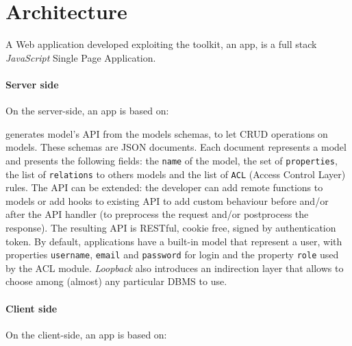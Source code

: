 \section{Architecture}\label{sec:architecture}

A Web application developed exploiting the  toolkit, an  app, is a full stack {\em JavaScript} Single Page Application.

\paragraph{Server side}

On the server-side, an  app is based on:

\begin{description}
\itemsep1pt\parskip0pt
\item[StrongLoop LoopBack] generates model’s API from the models schemas, to let CRUD operations on models.
These schemas are JSON documents. Each document represents a model and presents the following fields: the \texttt{name} of the model, the set of \texttt{properties}, the list of \texttt{relations} to others models and the list of \texttt{ACL} (Access Control Layer) rules. 
The API can be extended: the developer can add remote functions to models or add hooks to existing API to add custom behaviour before and/or after the API handler (to preprocess the request and/or postprocess the response). 
The resulting API is RESTful, cookie free, signed by authentication token.
By default, applications have a built-in model that represent a user, with properties \texttt{username}, \texttt{email} and \texttt{password} for login and the property \texttt{role} used by the ACL module.
{\em Loopback} also introduces an indirection layer that allows to choose among (almost) any particular DBMS to use.
\end{description}

\paragraph{Client side}

On the client-side, an  app is based on:

